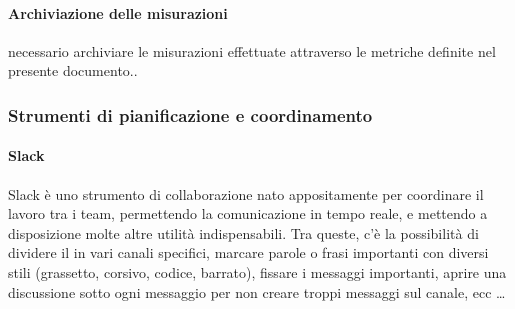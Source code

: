     		\paragraph{Archiviazione delle misurazioni} %
    		necessario archiviare le misurazioni effettuate attraverso le metriche definite nel presente documento..

    	\subsubsection{Strumenti di pianificazione e coordinamento}\label{pianificazione e coordinamento}

    		\paragraph{Slack}
			Slack è uno strumento di collaborazione nato appositamente per coordinare il lavoro tra i team, permettendo la comunicazione in tempo
			reale, e mettendo a disposizione molte altre utilità indispensabili. Tra queste, c'è la possibilità di dividere il  in vari canali
			specifici, marcare parole o frasi importanti con diversi stili (grassetto, corsivo, codice, barrato), fissare i messaggi importanti, aprire una discussione
			sotto ogni messaggio per non creare troppi messaggi sul canale, ecc \dots

